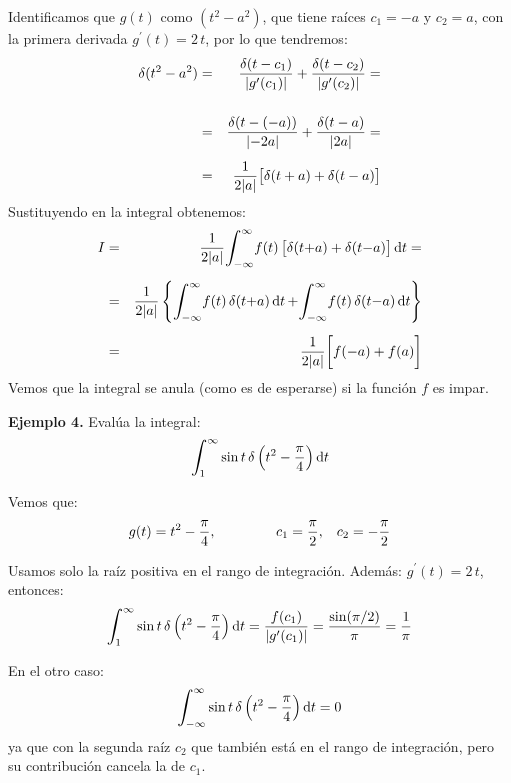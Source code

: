 \documentclass[12pt]{article}
\newcommand{\ptilde}[1]{\ensuremath{{#1}^{\prime}}}
\def\scaleint#1{\vcenter{\hbox{\scaleto[3ex]{\displaystyle\int}{#1}}}}
\def\bs{\mkern-12mu}
\numberwithin{equation}{section}
\begin{document}
Identificamos que $g(t)$ como $(t^{2} - a^{2})$,  que tiene raíces $c_{1} = -a$ y $c_{2} = a$, con la primera derivada $\ptilde{g}(t) = 2 \, t$, por lo que tendremos:
\begin{eqnarray*}
\delta(t^{2} - a^{2}) &=&  \dfrac{\delta (t - c_{1})}{\abs{\ptilde{g}(c_{1})}} + \dfrac{\delta (t - c_{2})}{\abs{\ptilde{g}(c_{2})}} = \\[0.5cm] 
&=& \dfrac{\delta (t - (-a))}{\abs{-2a}} + \dfrac{\delta (t - a)}{\abs{2a}} = \\[0.5em] 
&=& \dfrac{1}{2 \abs{a}} \big[ \delta(t + a) + \delta(t - a) \big]
\end{eqnarray*}
Sustituyendo en la integral obtenemos:
\begin{eqnarray*}
I &=& \dfrac{1}{2 \abs{a}} \scaleint{6ex}_{\bs -\infty}^{\infty} f(t) \, \big[ \delta(t {+} a) + \delta(t {-} a) \big] \dd{t} = \\[0.5em] 
&=& \dfrac{1}{2 \abs{a}} \left\{ \scaleint{6ex}_{\bs -\infty}^{\infty} f(t) \, \delta(t {+} a) \dd{t} {+} \scaleint{6ex}_{\bs -\infty}^{\infty} f(t) \, \delta(t {-} a) \dd{t} \right\} \\[0.5em] 
&=& \dfrac{1}{2 \abs{a}} \bigg[ f(-a) + f(a) \bigg]
\end{eqnarray*}
Vemos que la integral se anula (como es de esperarse) si la función $f$ es impar.

\noindent
\textbf{Ejemplo 4. } Evalúa la integral:
\begin{align*}
\scaleint{6ex}_{\bs 1}^{\infty} \sin t \, \delta \left( t^{2} - \dfrac{\pi}{4} \right) \dd{t}
\end{align*}

Vemos que:
\begin{align*}
g(t) = t^{2} - \dfrac{\pi}{4}, \hspace{1.5cm} c_{1} = \dfrac{\pi}{2}, \hspace{0.3cm} c_{2} = - \dfrac{\pi}{2}
\end{align*}

Usamos solo la raíz positiva en el rango de integración. Además: $\ptilde{g}(t) =  2 \, t$, entonces: 
\begin{align*}
\scaleint{6ex}_{\bs 1}^{\infty} \sin t \, \delta \left( t^{2} - \dfrac{\pi}{4} \right) \dd{t} =  \dfrac{f(c_{1})}{\abs{\ptilde{g}(c_{1})}} = \dfrac{\sin (\pi/2)}{\pi} = \dfrac{1}{\pi}
\end{align*}

En el otro caso:
\begin{align*}
\scaleint{6ex}_{\bs -\infty}^{\infty} \sin t \, \delta \left( t^{2} - \dfrac{\pi}{4} \right) \dd{t} = 0
\end{align*}
ya que con la segunda raíz $c_{2}$ que también está en el rango de integración, pero su contribución cancela la de $c_{1}$.
\end{document}

